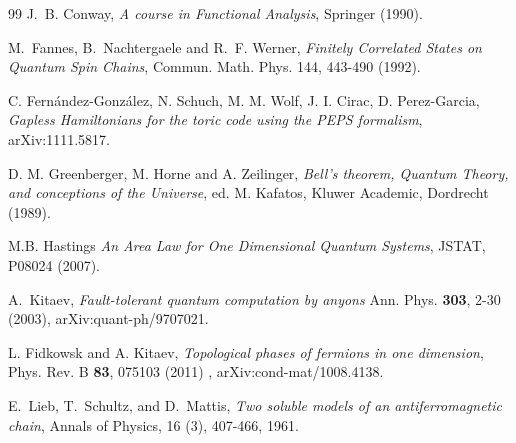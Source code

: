\documentclass[cmp]{svjour}
\begin{document}
\begin{thebibliography}{99}
     J.~B. Conway, \emph{A course in Functional Analysis}, Springer (1990).


     M.~Fannes, B.~Nachtergaele and R.~F. Werner,
    \newblock \emph{Finitely Correlated States on Quantum Spin Chains},
    \newblock Commun. Math. Phys. 144, 443-490 (1992).



     C. Fern{\'a}ndez-Gonz{\'a}lez, N. Schuch, M. M. Wolf, J. I. Cirac, D. Perez-Garcia,
    \newblock \emph{ Gapless Hamiltonians for the toric code using the PEPS formalism},
    \newblock  arXiv:1111.5817.


    D. M. Greenberger, M. Horne and A. Zeilinger, \emph{Bell’s theorem, Quantum Theory, and conceptions of the Universe},
    ed. M. Kafatos, Kluwer Academic, Dordrecht (1989).




     M.B. Hastings
    \newblock \emph{An Area Law for One Dimensional Quantum Systems},
    \newblock  JSTAT, P08024 (2007).



    A.~Kitaev, \emph{Fault-tolerant quantum computation by anyons}
    \newblock Ann. Phys. {\bf 303}, 2-30 (2003), arXiv:quant-ph/9707021.



    L. Fidkowsk and A. Kitaev, \emph{Topological phases of fermions in one dimension},
    \newblock Phys. Rev. B {\bf 83}, 075103 (2011)%
    , arXiv:cond-mat/1008.4138.


    E.~Lieb, T.~Schultz, and D.~Mattis,
    \newblock \emph{Two soluble models of an antiferromagnetic chain},
    \newblock Annals of Physics, 16 (3), 407-466, 1961.


\end{thebibliography}
\end{document}
